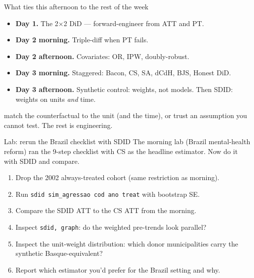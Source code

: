 \documentclass[aspectratio=169,11pt]{beamer}
\begin{document}
\begin{frame}{What ties this afternoon to the rest of the week}
\vspace{0.6em}
\begin{itemize}
  \item \textbf{Day 1.} \;The 2$\times$2 DiD --- forward-engineer from ATT and PT.
  \item \textbf{Day 2 morning.} \;Triple-diff when PT fails.
  \item \textbf{Day 2 afternoon.} \;Covariates: OR, IPW, doubly-robust.
  \item \textbf{Day 3 morning.} \;Staggered: Bacon, CS, SA, dCdH, BJS, Honest DiD.
  \item \textbf{Day 3 afternoon.} \;Synthetic control: weights, not models. Then SDID: weights on units \textit{and} time.
\end{itemize}

\vspace{0.7em}
 \;match the counterfactual to the unit (and the time), or trust an assumption you cannot test. \;The rest is engineering.

\vspace{0.5em}
\end{frame}

\begin{frame}{Lab: rerun the Brazil checklist with SDID}
\vspace{0.4em}
The morning lab (Brazil mental-health reform) ran the 9-step checklist with CS as the headline estimator. \;Now do it with SDID and compare.

\vspace{0.4em}
\begin{enumerate}\small
  \item Drop the 2002 always-treated cohort (same restriction as morning).
  \item Run \texttt{sdid sim\_agressao cod ano treat} with bootstrap SE.
  \item Compare the SDID ATT to the CS ATT from the morning.
  \item Inspect \texttt{sdid, graph}: do the weighted pre-trends look parallel?
  \item Inspect the unit-weight distribution: which donor municipalities carry the synthetic Basque-equivalent?
  \item Report which estimator you'd prefer for the Brazil setting and why.
\end{enumerate}

\vspace{0.4em}
\end{frame}
\end{document}
